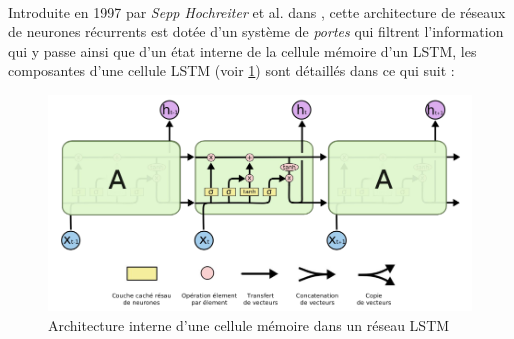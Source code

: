 		\paragraph{}
		Introduite en 1997 par \textit{	Sepp Hochreiter } et al. dans \cite{lstm_original_paper}, cette architecture de réseaux de neurones récurrents est dotée d'un système de \textit{portes} qui filtrent l'information qui y passe ainsi que d'un état interne de la cellule mémoire d'un LSTM, les composantes d'une cellule LSTM (voir \ref{lstm_architecture}) sont détaillés dans ce qui suit : 
		\begin{figure}[H]
			\centering
			\includegraphics[width=0.55\linewidth]{images/notions/lstm_arch.png}
			\caption{Architecture interne d'une cellule mémoire dans un réseau LSTM \cite{rnns_online}}
			\label{lstm_architecture}
		\end{figure}
